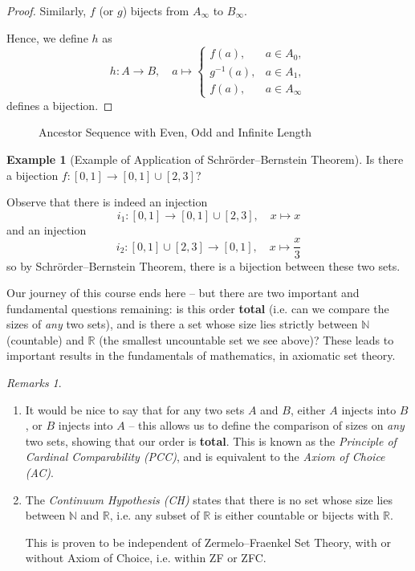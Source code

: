 \documentclass{article}
\theoremstyle{definition}
\newtheorem{example}[theorem]{Example}
\theoremstyle{remark}
\newtheorem{remarks}[theorem]{Remarks}
\newcommand{\pqty}[1]{\left(#1\right)}
\newcommand{\functiondomain}[3]{#1:#2\to #3}
\newcommand{\function}[5]{#1:#2\to #3,\quad #4\mapsto #5}
\newcommand{\ccintv}[2]{[#1,#2]}
\newcommand{\inverse}{^{-1}}
\newcommand{\NN}{\mathbb{N}}
\newcommand{\RR}{\mathbb{R}}
\begin{document}
\begin{proof}
    Similarly, \(f\) (or \(g\)) bijects from \(A_{\infty}\) to \(B{_{\infty}}\).

    Hence, we define \(h\) as
    \[
        \function{h}{A}{B}{a}{\begin{cases}
            f\pqty{a}, & a \in A_0, \\
            g\inverse\pqty{a}, & a \in A_1, \\
            f\pqty{a}, & a \in A_{\infty}
        \end{cases}}
    \]
    defines a bijection.
\end{proof}

\begin{figure}[ht!]
    \centering
    \caption{Ancestor Sequence with Even, Odd and Infinite Length}
    \label{fig:ancestor-sequence-even-odd-infinite-length}
\end{figure}

\begin{example}[Example of Application of Schr\"{o}rder--Bernstein Theorem]
    Is there a bijection \(\functiondomain{f}{\ccintv{0}{1}}{\ccintv{0}{1} \cup \ccintv{2}{3}}\)?

    Observe that there is indeed an injection
    \[
        \function{i_1}{\ccintv{0}{1}}{\ccintv{0}{1} \cup \ccintv{2}{3}}{x}{x}
    \]
    and an injection
    \[
        \function{i_2}{\ccintv{0}{1} \cup \ccintv{2}{3}}{\ccintv{0}{1}}{x}{\frac{x}{3}}
    \]
    so by Schr\"{o}rder--Bernstein Theorem, there is a bijection between these two sets.
\end{example}

Our journey of this course ends here -- but there are two important and fundamental questions remaining: is this order \textbf{total} (i.e. can we compare the sizes of \emph{any} two sets), and is there a set whose size lies strictly between \(\NN\) (countable) and \(\RR\) (the smallest uncountable set we see above)? These leads to important results in the fundamentals of mathematics, in axiomatic set theory.

\begin{remarks}
    \begin{enumerate}
        \item It would be nice to say that for any two sets \(A\) and \(B\), either \(A\) injects into \(B\), or \(B\) injects into \(A\) -- this allows us to define the comparison of sizes on \emph{any} two sets, showing that our order is \textbf{total}. This is known as the \emph{Principle of Cardinal Comparability (PCC)}, and is equivalent to the \emph{Axiom of Choice (AC)}.
        
        \item The \emph{Continuum Hypothesis (CH)} states that there is no set whose size lies between \(\NN\) and \(\RR\), i.e. any subset of \(\RR\) is either countable or bijects with \(\RR\).
        
        This is proven to be independent of Zermelo--Fraenkel Set Theory, with or without Axiom of Choice, i.e. within ZF or ZFC.
    \end{enumerate}
\end{remarks}
\end{document}
